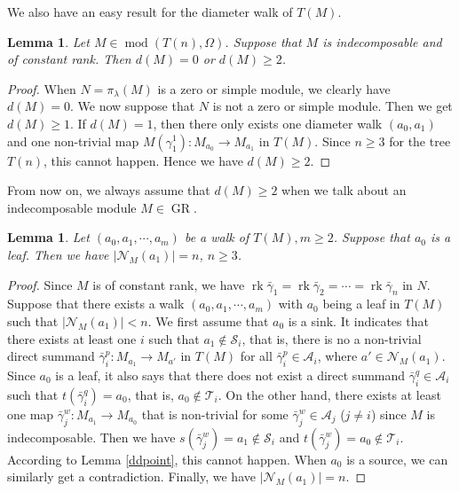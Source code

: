\documentclass[a4paper,12pt]{amsart}
\newcommand{\cA}{\mathcal{A}}
\newcommand{\bg}{\bar{\gamma}}
\newcommand{\cT}{\mathcal{T}}
\newcommand{\cS}{\mathcal{S}}
\DeclareMathOperator{\rk}{rk}
\DeclareMathOperator{\modd}{mod}
\DeclareMathOperator{\GR}{GR}
\newtheorem{Lemma}[proposition]{Lemma}
\begin{document}
We also have an easy result for the diameter walk of $T(M)$.

\begin{Lemma}
Let $M\in \modd(T(n),\Omega)$.     Suppose that $M$ is indecomposable and of constant rank. Then $d(M)=0$  or $d(M)\geq 2$.

\end{Lemma}
\begin{proof}
When $N=\pi_\lambda(M)$ is a zero or simple module,  we clearly have $d(M)=0$. We now suppose that $N$ is not a zero or simple module. Then we get $d(M)\geq 1$. If $d(M)=1$, then there only exists  one  diameter walk $(a_0, a_1)$ and one non-trivial map $M(\gamma^1_1): M_{a_0}\rightarrow M_{a_1}$ in $T(M)$. Since $n\geq 3$  for the tree $T(n)$, this cannot happen. Hence we have $d(M)\geq 2$.

\end{proof}

From now on, we always assume that $d(M)\geq 2$ when we talk about an indecomposable module $M\in \GR$.


\begin{Lemma}\label{point}
 Let $(a_0,a_1,\cdots,a_m)$ be  a  walk of $T(M), m\geq 2$. Suppose that $a_0$ is a leaf. Then we have $\mid \mathcal{N}_M(a_1)\mid=n$, $n\geq 3$.
\end{Lemma}
\begin{proof}
Since    $M$ is of constant rank, we have   $\rk \bg_1=\rk \bg_2=\cdots=\rk\bg_n$ in $N$.   Suppose that there exists a walk $(a_0,a_1,\cdots,a_m)$ with $a_0$ being a leaf in $T(M)$ such that  $\mid \mathcal{N}_M(a_1) \mid <n$. We first assume that  $a_0$ is a sink. It indicates that there exists at least one  $i$ such that $a_1\nin \cS_i$,  that is, there is no a   non-trivial direct summand  $\bg^p_i: M_{a_1}\rightarrow M_{a'}$ in $T(M)$ for all $\bg^p_i\in \cA_i$, where $ a'\in \mathcal{N}_M(a_1)$. Since $a_0$ is a leaf, it also says that there does not exist a direct summand $\bg^{q}_i\in \cA_i$  such that $t(\bg^{q}_i)=a_{0}$, that is, $a_0\nin \cT_i$. On the other hand,  there  exists at least  one map $\bg^{w}_{j}: M_{a_1}\rightarrow M_{a_0} $ that is non-trivial for some $\bg^w_j\in \cA_j$ ($j\neq i$) since $M$ is indecomposable. Then we have $s(\bg^w_j)=a_1\nin \cS_i$ and $t(\bg^w_j)=a_0 \nin \cT_i$. According to  Lemma \ref{ddpoint}, this cannot happen. When $a_0$ is a source, we can similarly get a contradiction. Finally, we have
$\mid \mathcal{N}_M(a_1)\mid=n.$
\end{proof}
\end{document}
